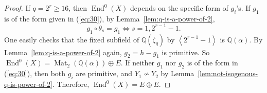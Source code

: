 \documentclass{amsart}[11pt]
\theoremstyle{definition}
\numberwithin{equation}{section}
\theoremstyle{notitle}
\begin{document}
\begin{proof}
 If $q=2^r\geq 16$, then $\operatorname{End}^0(X)$ depends on the
 specific form of $g_i$'s. If $g_1$ is of the form given in
 (\ref{eq:30}), by Lemma~\ref{lem:q-is-a-power-of-2}, 
 \[ g_1\circ \theta_s= g_1 \Leftrightarrow s=1, 2^{r-1}-1.\] One
 easily checks that the fixed subfield of ${\mathbb{Q}}(\zeta_q)$ by
 ${\left\langle {2^{r-1}-1} \right\rangle}$ is ${\mathbb{Q}}(\alpha)$. By
 Lemma~\ref{lem:q-is-a-power-of-2} again, $g_2=h-g_1$ is primitive. So
 $\operatorname{End}^0(X) = \operatorname{Mat}_2({\mathbb{Q}}(\alpha))\oplus E$. If neither $g_1$ nor $g_2$
 is of the form in (\ref{eq:30}), then both $g_i$ are primitive, and
 $Y_1\not\sim Y_2$ by
 Lemma~\ref{lem:not-isogenous-q-is-power-of-2}. Therefore,
 $\operatorname{End}^0(X)=E\oplus E$.
\end{proof}

 
 
 
 
 
 
 
 
 
 
 
 
\end{document}
